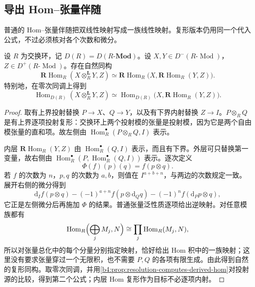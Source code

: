 \subsection{导出 Hom–张量伴随}
\label{b4:subsec:1803:02}

普通的 Hom--张量伴随把双线性映射写成一族线性映射。复形版本仍用同一个代入公式，不过必须核对各个次数和微分。

\begin{theorem}\label{b4:thm:derived-hom-tensor-adjunction}
	设 \(R\) 为交换环，记 \(D(R)=D(R\text{-}\mathbf{Mod})\)。设 \(X,Y\in D^-(R\text{-}\operatorname{Mod})\)，\(Z\in D^+(R\text{-}\operatorname{Mod})\)。存在自然同构
	\[
		\mathbf R\operatorname{Hom}_R(X\otimes_R^{\mathbf L}Y,Z) \simeq \mathbf R\operatorname{Hom}_R \bigl(X,\mathbf R\operatorname{Hom}_R(Y,Z)\bigr).
	\]
	特别地，在零次同调上得到
	\[
		\operatorname{Hom}_{D(R)}(X\otimes_R^{\mathbf L}Y,Z) \simeq \operatorname{Hom}_{D(R)} \bigl(X,\mathbf R\operatorname{Hom}_R(Y,Z)\bigr).
	\]
\end{theorem}
\begin{proof}
	取有上界投射替换 \(P\to X\)、\(Q\to Y\)，以及有下界内射替换 \(Z\to I\)。\(P\otimes_RQ\) 是有上界逐项投射复形：交换环上两个投射模的张量是投射模，因为它是两个自由模张量的直和项。故左侧由 \(\operatorname{Hom}^\bullet_R(P\otimes_RQ,I)\) 表示。

	内层 \(\mathbf R\operatorname{Hom}_R(Y,Z)\) 由 \(\operatorname{Hom}^\bullet_R(Q,I)\) 表示，而且有下界。外层可只替换第一变量，故右侧由 \(\operatorname{Hom}^\bullet_R(P,\operatorname{Hom}^\bullet_R(Q,I))\) 表示。逐次定义
	\[
		\Phi(f)(p)(q)=f(p\otimes q).
	\]
	若 \(f\) 的次数为 \(n\)，\(p,q\) 的次数为 \(a,b\)，则值在 \(I^{a+b+n}\)，与两边的次数规定一致。展开右侧的微分得到
	\[
		\mathrm{d}_I f(p\otimes q) -(-1)^{a+n}f(p\otimes \mathrm{d}_Qq) -(-1)^n f(\mathrm{d}_Pp\otimes q),
	\]
	它正是左侧微分后再施加 \(\Phi\) 的结果。普通张量泛性质逐项给出逆映射。对任意模族都有
	\[
		\operatorname{Hom}_R\Bigl(\bigoplus_j M_j,N\Bigr) \cong\prod_j\operatorname{Hom}_R(M_j,N),
	\]
	所以对张量总化中的每个分量分别指定映射，恰好给出 Hom 积中的一族映射；这里没有要求张量穿过一个无限积，也不需要 \(P,Q\) 的各项有限生成。由此得到自然的复形同构。取零次同调，并用\cref{b4:prop:resolution-computes-derived-hom}对投射源的比较，得到第二个公式；内层 Hom 复形作为目标不必逐项内射。
\end{proof}

